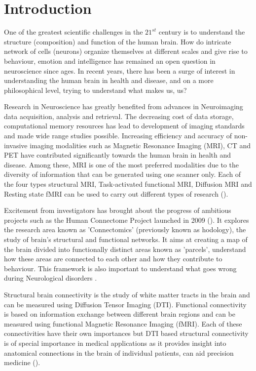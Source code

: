 \documentclass[msthesis.tex]{subfiles}
\begin{document}
\chapter{Introduction}
One of the greatest scientific challenges in the $21^{st}$ century is to understand the structure (composition) and function of the human brain. How do intricate network of cells (neurons) organize themselves at different scales and give rise to behaviour, emotion and intelligence has remained an open question in neuroscience since ages. In recent years, there has been a surge of interest in understanding the human brain in health and disease, and on a more philosophical level, trying to understand what makes us, us? 

Research in Neuroscience has greatly benefited from advances in Neuroimaging data acquisition, analysis and retrieval. The decreasing cost of data storage, computational memory resources has lead to development of imaging standards and made wide range studies possible. Increasing efficiency and accuracy of non-invasive imaging modalities such as Magnetic Resonance Imaging (MRI), CT and PET have contributed significantly towards the human brain in health and disease. Among these, MRI is one of the most preferred modalities due to the diversity of information that can be generated using one scanner only. Each of the four types structural MRI, Task-activated functional MRI, Diffusion MRI and Resting state fMRI can be used to carry out different types of research (\cite{van2016human}). 

Excitement from investigators has brought about the progress of ambitious projects such as the Human Connectome Project launched in 2009 (\cite{van2016human}). It explores the research area known as 'Connectomics' (previously known as hodology), the study of brain's structural and functional networks.  It aims at creating a map of the brain divided into functionally distinct areas known as 'parcels', understand how these areas are connected to each other and how they contribute to behaviour. This framework is also important to understand what goes wrong during Neurological disorders \cite{sala2015reorganization}. 

Structural brain connectivity is the study of white matter tracts in the brain and can be measured using Diffusion Tensor Imaging (DTI). Functional connectivity is based on information exchange between different brain regions and can be measured using functional Magnetic Resonance Imaging (fMRI). Each of these connectivities have their own importances but DTI based structural connectivity is of special importance in medical applications as it provides insight into anatomical connections in the brain of individual patients, can aid precision medicine (\cite{cociu2017multimodal}).
\end{document}
